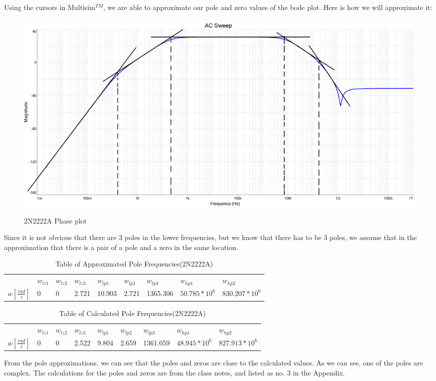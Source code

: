 \documentclass[12pt]{article}
\begin{document}
Using the cursors in Multisim$^{TM}$, we are able to approximate our pole and zero values of the bode plot. Here is how we will approximate it:

\begin{figure}[h!]
\centering
\includegraphics[height=0.45\textwidth]{Images/2abode_approximations_2N2222A.png}\\
\caption{2N2222A Phase plot}
\label{fig:part3_phaseplot}
\end{figure}

Since it is not obvious that there are 3 poles in the lower frequencies, but we know that there has to be 3 poles, we assume that in the approximation that there is a pair of a pole and a zero in the same location.




\begin{table}[h!]
\centering
\begin{tabular}{|l|l|l|l|l|l|l|l|l|}
\cline{1-2} \cline{3-9}
             & $w_{lz1}$ & $w_{lz2}$ & $w_{lz3}$ & $w_{lp1}$  & $w_{lp2}$  & $w_{lp3}$     & $w_{hp1}$          & $w_{hp2}$           \\ \cline{1-2} \cline{3-9}
$w[\frac{rad}{s}]$ &  0    & 0     & 2.721      & 10.903 & 2.721 & 1365.306 & $50.785*10^6$ & $830.207*10^6$ \\
\hline
\end{tabular}
\caption{Table of Approximated Pole Frequencies(2N2222A)}
\label{table:2N2222A_Approximated_Poles}
\end{table}
\begin{table}[h!]
\centering
\begin{tabular}{|l|l|l|l|l|l|l|l|l|}
\cline{1-2} \cline{3-9}
             & $w_{lz1}$ & $w_{lz2}$ & $w_{lz3}$ & $w_{lp1}$  & $w_{lp2}$  & $w_{lp3}$     & $w_{hp1}$          & $w_{hp2}$           \\ \cline{1-2} \cline{3-9}
$w[\frac{rad}{s}]$ &  0    & 0     & 2.522      & 9.804 & 2.659 & 1361.059 & $48.945*10^6$ & $ 827.913*10^6$ \\
\hline
\end{tabular}
\caption{Table of Calculated Pole Frequencies(2N2222A)}
\label{table:2N2222A_Calculated_Poles}
\end{table}
\FloatBarrier
From the pole approximations, we can see that the poles and zeros are close to the calculated values. As we can see, one of the poles are complex. The calculations for the poles and zeros are from the class notes, and listed as no. 3 in the Appendix.
\end{document}
